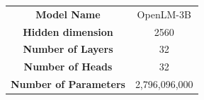 \centering
    \resizebox{0.99\linewidth}{!}
    {
    \begin{tabular}{c|c}
    \toprule[1.5pt]
      {\bf Model Name} & OpenLM-3B\\
      {\bf Hidden dimension} & 2560\\
      {\bf Number of  Layers} & 32\\
      {\bf Number of  Heads} & 32\\
      {\bf Number of  Parameters} & 2,796,096,000\\
        \bottomrule[1pt]
    \end{tabular}
        }